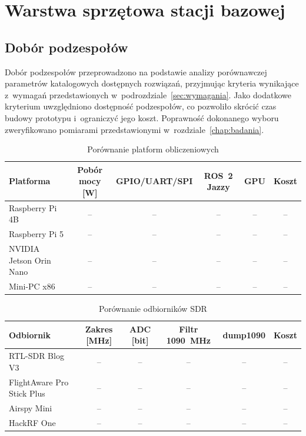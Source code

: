 \chapter{Warstwa sprzętowa stacji bazowej}
\label{chap:sprzet}


\section{Dobór podzespołów}
\label{sec:dobor}

Dobór podzespołów przeprowadzono na podstawie analizy porównawczej parametrów
katalogowych dostępnych rozwiązań, przyjmując kryteria wynikające z~wymagań
przedstawionych w~podrozdziale~\ref{sec:wymagania}. Jako dodatkowe kryterium
uwzględniono dostępność podzespołów, co pozwoliło skrócić czas budowy
prototypu i~ograniczyć jego koszt. Poprawność dokonanego wyboru zweryfikowano
pomiarami przedstawionymi w~rozdziale~\ref{chap:badania}.

\begin{table}[H]
  \centering
  \caption{Porównanie platform obliczeniowych}
  \label{tab:platformy}
  \small
  \begin{tabular}{l c c c c c}
    \toprule
    Platforma & Pobór mocy [W] & GPIO/UART/SPI & ROS~2 Jazzy & GPU & Koszt \\
    \midrule
    Raspberry Pi 4B       & -- & -- & -- & -- & -- \\
    Raspberry Pi 5        & -- & -- & -- & -- & -- \\
    NVIDIA Jetson Orin Nano & -- & -- & -- & -- & -- \\
    Mini-PC x86           & -- & -- & -- & -- & -- \\
    \bottomrule
  \end{tabular}
\end{table}

\begin{table}[H]
  \centering
  \caption{Porównanie odbiorników SDR}
  \label{tab:sdr}
  \small
  \begin{tabular}{l c c c c c}
    \toprule
    Odbiornik & Zakres [MHz] & ADC [bit] & Filtr 1090~MHz & dump1090 & Koszt \\
    \midrule
    RTL-SDR Blog V3             & -- & -- & -- & -- & -- \\
    FlightAware Pro Stick Plus  & -- & -- & -- & -- & -- \\
    Airspy Mini                 & -- & -- & -- & -- & -- \\
    HackRF One                  & -- & -- & -- & -- & -- \\
    \bottomrule
  \end{tabular}
\end{table}


